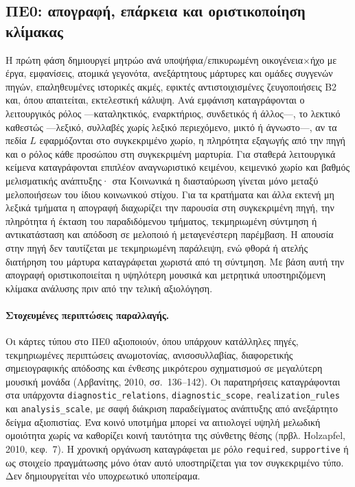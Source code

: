 \documentclass[11pt,a4paper]{article}
\begin{document}
\subsection{ΠΕ0: απογραφή, επάρκεια και οριστικοποίηση κλίμακας}\label{sec:pilot-decision}

Η πρώτη φάση δημιουργεί μητρώο ανά υποψήφια/επικυρωμένη οικογένεια×ήχο με έργα, εμφανίσεις, ατομικά γεγονότα, ανεξάρτητους μάρτυρες και ομάδες συγγενών πηγών, επαληθευμένες ιστορικές ακμές, εφικτές αντιστοιχισμένες ζευγοποιήσεις B2 και, όπου απαιτείται, εκτελεστική κάλυψη. Ανά εμφάνιση καταγράφονται ο λειτουργικός ρόλος ---καταληκτικός, εναρκτήριος, συνδετικός ή άλλος---, το λεκτικό καθεστώς ---λεξικό, συλλαβές χωρίς λεξικό περιεχόμενο, μικτό ή άγνωστο---, αν τα πεδία $L$ εφαρμόζονται στο συγκεκριμένο χωρίο, η πληρότητα εξαγωγής από την πηγή και ο ρόλος κάθε προσώπου στη συγκεκριμένη μαρτυρία. Για σταθερά λειτουργικά κείμενα καταγράφονται επιπλέον αναγνωριστικό κειμένου, κειμενικό χωρίο και βαθμός μελισματικής ανάπτυξης· στα Κοινωνικά η διασταύρωση γίνεται μόνο μεταξύ μελοποιήσεων του ίδιου κοινωνικού στίχου. Για τα κρατήματα και άλλα εκτενή μη λεξικά τμήματα η απογραφή διαχωρίζει την παρουσία στη συγκεκριμένη πηγή, την πληρότητα ή έκταση του παραδιδόμενου τμήματος, τεκμηριωμένη σύντμηση ή αντικατάσταση και απόδοση σε μελοποιό ή μεταγενέστερη παρέμβαση. Η απουσία στην πηγή δεν ταυτίζεται με τεκμηριωμένη παράλειψη, ενώ φθορά ή ατελής διατήρηση του μάρτυρα καταγράφεται χωριστά από τη σύντμηση. Με βάση αυτή την απογραφή οριστικοποιείται η υψηλότερη μουσικά και μετρητικά υποστηριζόμενη κλίμακα ανάλυσης πριν από την τελική αξιολόγηση.

\paragraph{Στοχευμένες περιπτώσεις παραλλαγής.} Οι κάρτες τύπου στο ΠΕ0 αξιοποιούν, όπου υπάρχουν κατάλληλες πηγές, τεκμηριωμένες περιπτώσεις ανωμοτονίας, ανισοσυλλαβίας, διαφορετικής σημειογραφικής απόδοσης και ένθεσης μικρότερου σχηματισμού σε μεγαλύτερη μουσική μονάδα (Αρβανίτης, 2010, σσ.~136--142). Οι παρατηρήσεις καταγράφονται στα υπάρχοντα \texttt{diagnostic\_relations}, \texttt{diagnostic\_scope}, \texttt{realization\_rules} και \texttt{analysis\_scale}, με σαφή διάκριση παραδείγματος ανάπτυξης από ανεξάρτητο δείγμα αξιοπιστίας. Ένα κοινό υποτμήμα μπορεί να αιτιολογεί υψηλή μελωδική ομοιότητα χωρίς να καθορίζει κοινή ταυτότητα της σύνθετης θέσης (πρβλ. Holzapfel, 2010, κεφ.~7). Η χρονική οργάνωση καταγράφεται με ρόλο \texttt{required}, \texttt{supportive} ή ως στοιχείο πραγμάτωσης μόνο όταν αυτό υποστηρίζεται για τον συγκεκριμένο τύπο. Δεν δημιουργείται νέο υποχρεωτικό υποπείραμα.
\end{document}
